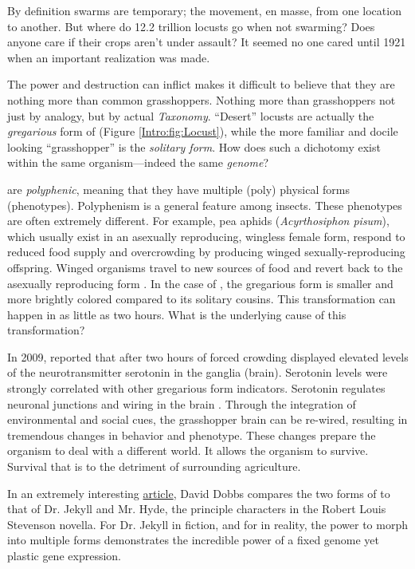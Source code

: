   By definition swarms are temporary; the movement, en masse, from one location to another. But where do 12.2 trillion locusts go when not swarming? Does anyone care if their crops aren't under assault? It seemed no one cared until 1921 when an important realization was made.

  The power and destruction \locusts{} can inflict makes it difficult to believe that they are nothing more than common grasshoppers. Nothing more than grasshoppers not just by analogy, but by actual \textit{Taxonomy}. ``Desert'' locusts are actually the \textit{gregarious} form  of \locusts{} (Figure \ref{Intro:fig:Locust}), while the more familiar and docile looking ``grasshopper'' is the \textit{solitary form}. How does such a dichotomy exist within the same organism---indeed the same \textit{genome}?

  \locusts{} are \textit{polyphenic}, meaning that they have multiple (poly) physical forms (phenotypes). Polyphenism is a general feature among insects. These phenotypes are often extremely different. For example, pea aphids (\textit{Acyrthosiphon pisum}), which usually exist in an asexually reproducing, wingless female form, respond to reduced food supply and overcrowding by producing winged sexually-reproducing offspring. Winged organisms travel to new sources of food and revert back to the asexually reproducing form \citep{Shingleton2003,Purandare2014b}. In the case of \locusts{}, the gregarious form is smaller and more brightly colored compared to its solitary cousins. This transformation can happen in as little as two hours. What is the underlying cause of this transformation?

  In 2009, \citet{Anstey2009} reported that after two hours of forced crowding \locusts{} displayed elevated levels of the neurotransmitter serotonin in the ganglia (brain). Serotonin levels were strongly correlated with other gregarious form indicators. Serotonin regulates neuronal junctions and wiring in the brain \citep{Hoeffer2003}. Through the integration of environmental and social cues, the grasshopper brain can be re-wired, resulting in tremendous changes in behavior and phenotype. These changes prepare the organism to deal with a different world. It allows the organism to survive. Survival that is to the detriment of surrounding agriculture.

  In an extremely interesting \href{http://aeon.co/magazine/nature-and-cosmos/why-its-time-to-lay-the-selfish-gene-to-rest/}{article}, David Dobbs compares the two forms of \locusts{} to that of Dr. Jekyll and Mr. Hyde, the principle characters in the Robert Louis Stevenson novella. For Dr. Jekyll in fiction, and for \locusts{} in reality, the power to morph into multiple forms demonstrates the incredible power of a fixed genome yet plastic gene expression. 

